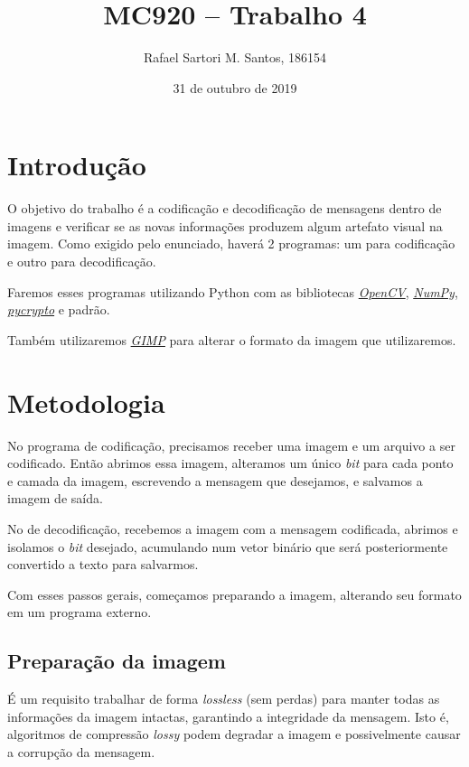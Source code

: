 \documentclass[brazilian,a4paper,twocolumn]{article}
\title{MC920 -- Trabalho 4}
\author{Rafael Sartori M. Santos, 186154}
\date{31 de outubro de 2019}
\begin{document}
\maketitle


\section{Introdução}

    O objetivo do trabalho é a codificação e decodificação de mensagens dentro de imagens e verificar se as novas informações produzem algum artefato visual na imagem. Como exigido pelo enunciado, haverá 2 programas: um para codificação e outro para decodificação.

    Faremos esses programas utilizando Python com as bibliotecas \href{https://opencv.org/}{\emph{OpenCV}}, \href{https://numpy.org/}{\emph{NumPy}}, \href{https://pycrypto.org/}{\emph{pycrypto}} e padrão.

    Também utilizaremos \href{https://www.gimp.org/}{\emph{GIMP}} para alterar o formato da imagem que utilizaremos.


\section{Metodologia}

    No programa de codificação, precisamos receber uma imagem e um arquivo a ser codificado. Então abrimos essa imagem, alteramos um único \textit{bit} para cada ponto e camada da imagem, escrevendo a mensagem que desejamos, e salvamos a imagem de saída.

    No de decodificação, recebemos a imagem com a mensagem codificada, abrimos e isolamos o \textit{bit} desejado, acumulando num vetor binário que será posteriormente convertido a texto para salvarmos.

    Com esses passos gerais, começamos preparando a imagem, alterando seu formato em um programa externo.

    \subsection{Preparação da imagem}
        É um requisito trabalhar de forma \textit{lossless} (sem perdas) para manter todas as informações da imagem intactas, garantindo a integridade da mensagem. Isto é, algoritmos de compressão \textit{lossy} podem degradar a imagem e possivelmente causar a corrupção da mensagem.
\end{document}
